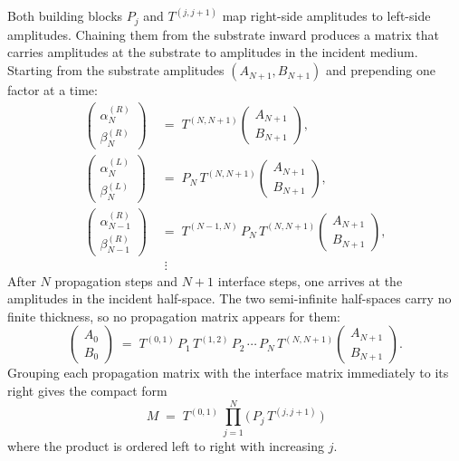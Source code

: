 \documentclass[aps,prb,onecolumn,superscriptaddress,nofootinbib,11pt]{revtex4-2}
\begin{document}
Both building blocks $P_j$ and $T^{(j,j+1)}$ map right-side amplitudes to left-side amplitudes. Chaining them from the substrate inward produces a matrix that carries amplitudes at the substrate to amplitudes in the incident medium. Starting from the substrate amplitudes $(A_{N+1}, B_{N+1})$ and prepending one factor at a time:
\begin{align}
  \begin{pmatrix} \alpha_N^{(R)} \\ \beta_N^{(R)}
  \end{pmatrix}
  &\;=\; T^{(N,N+1)}
  \begin{pmatrix} A_{N+1} \\ B_{N+1}
  \end{pmatrix},
  \\[2pt]
  \begin{pmatrix} \alpha_N^{(L)} \\ \beta_N^{(L)}
  \end{pmatrix}
  &\;=\; P_N\, T^{(N,N+1)}
  \begin{pmatrix} A_{N+1} \\ B_{N+1}
  \end{pmatrix},
  \\[2pt]
  \begin{pmatrix} \alpha_{N-1}^{(R)} \\ \beta_{N-1}^{(R)}
  \end{pmatrix}
  &\;=\; T^{(N-1,N)}\, P_N\, T^{(N,N+1)}
  \begin{pmatrix} A_{N+1} \\ B_{N+1}
  \end{pmatrix},
  \\[-2pt]
  &\;\;\vdots
\end{align}
After $N$ propagation steps and $N+1$ interface steps, one arrives at the amplitudes in the incident half-space. The two semi-infinite half-spaces carry no finite thickness, so no propagation matrix appears for them:
\begin{equation}
  \begin{pmatrix} A_0 \\ B_0
  \end{pmatrix}
  \;=\;
  T^{(0,1)}\, P_1\, T^{(1,2)}\, P_2\, \cdots\, P_N\, T^{(N,N+1)}
  \begin{pmatrix} A_{N+1} \\ B_{N+1}
  \end{pmatrix}.
  \label{eq:chain}
\end{equation}
Grouping each propagation matrix with the interface matrix immediately to its right gives the compact form
\begin{equation}
  \boxed{\;
    M \;=\; T^{(0,1)}\,
    \prod_{j=1}^{N}\bigl(\, P_j\, T^{(j,j+1)} \,\bigr)
  \;}
  \label{eq:M-total}
\end{equation}
where the product is ordered left to right with increasing $j$.
\end{document}
